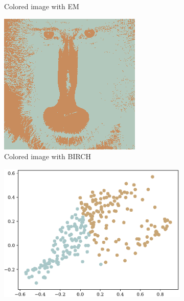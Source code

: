 \documentclass[sigconf,authorversion]{acmart}
\begin{document}
\begin{figure}[hbtp]
\begin{subfigure}[b]{0.25\textwidth}
      \caption{Colored image with EM}
      \label{subfig:baboon_hsv_gmm}
  \end{subfigure}
  \hspace{0.05\textwidth}
  \begin{subfigure}[b]{0.25\textwidth}
      \includegraphics[width=\textwidth]{../outputs/baboon_2_hsv_colored_birch.png}
      \caption{Colored image with BIRCH}
      \label{subfig:baboon_hsv_birch}
  \end{subfigure}
  \begin{subfigure}[b]{0.25\textwidth}
      \includegraphics[width=\textwidth]{../outputs/baboon_2_hsv_plot_kmeans.pdf}

\end{subfigure}
\end{figure}
\end{document}

